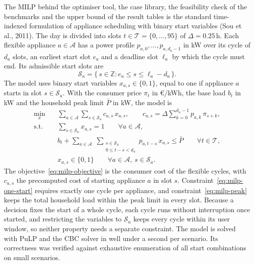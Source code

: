 \documentclass[12pt,a4paper]{report}
\begin{document}
The MILP behind the optimiser tool, the case library, the feasibility
check of the benchmarks and the upper bound of the result tables
is the standard time-indexed formulation of appliance scheduling with
binary start variables (Sou et al., 2011). The day is divided into slots $t \in \mathcal{T} =
\{0, \dots, 95\}$ of $\Delta = 0.25$\,h. Each flexible appliance
$a \in \mathcal{A}$ has a power profile $p_{a,0}, \dots, p_{a,d_a-1}$ in
kW over its cycle of $d_a$ slots, an earliest start slot $e_a$ and a
deadline slot $\ell_a$ by which the cycle must end. Its admissible start
slots are
\[
\mathcal{S}_a = \{\, s \in \mathbb{Z} : e_a \le s \le \ell_a - d_a \,\}.
\]
The model uses binary start variables $x_{a,s} \in \{0,1\}$, equal to one
if appliance $a$ starts in slot $s \in \mathcal{S}_a$. With the consumer
price $\pi_t$ in \euro/kWh, the base load $b_t$ in kW and the household
peak limit $\bar{P}$ in kW, the model is
\begin{align}
\min_{x} \quad & \sum_{a \in \mathcal{A}} \sum_{s \in \mathcal{S}_a}
  c_{a,s}\, x_{a,s},
  \qquad c_{a,s} = \Delta \sum_{k=0}^{d_a-1} p_{a,k}\, \pi_{s+k},
  \label{eq:milp-objective} \\
\text{s.t.} \quad & \sum_{s \in \mathcal{S}_a} x_{a,s} = 1
  \qquad \forall a \in \mathcal{A},
  \label{eq:milp-one-start} \\
& b_t + \sum_{a \in \mathcal{A}} \; \sum_{\substack{s \in \mathcal{S}_a \\ 0 \le t-s < d_a}}
  p_{a,t-s}\, x_{a,s} \le \bar{P}
  \qquad \forall t \in \mathcal{T},
  \label{eq:milp-peak} \\
& x_{a,s} \in \{0,1\}
  \qquad \forall a \in \mathcal{A},\ s \in \mathcal{S}_a .
  \nonumber
\end{align}
The objective~\eqref{eq:milp-objective} is the consumer cost of the
flexible cycles, with $c_{a,s}$ the precomputed cost of starting
appliance $a$ in slot $s$. Constraint~\eqref{eq:milp-one-start} requires
exactly one cycle per appliance, and constraint~\eqref{eq:milp-peak}
keeps the total household load within the peak limit in every slot.
Because a decision fixes the start of a whole cycle, each cycle runs
without interruption once started, and restricting the variables to
$\mathcal{S}_a$ keeps every cycle within its user window, so neither
property needs a separate constraint. The model is solved with PuLP and
the CBC solver in well under a second per scenario. Its correctness was
verified against exhaustive enumeration of all start combinations on
small scenarios.
\end{document}
